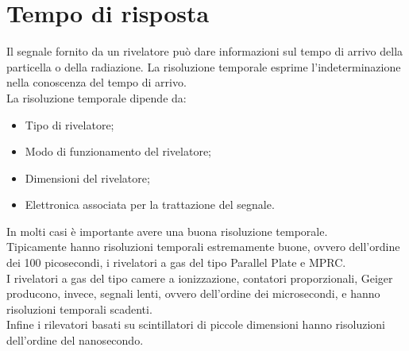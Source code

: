 \documentclass[12pt, letterpaper]{book}
\begin{document}
\section{Tempo di risposta}
Il segnale fornito da un rivelatore può dare informazioni sul tempo di arrivo della particella o della radiazione. La risoluzione temporale esprime l'indeterminazione nella conoscenza del tempo di arrivo.\\
La risoluzione temporale dipende da:
\begin{itemize}
    \item Tipo di rivelatore;
    \item Modo di funzionamento del rivelatore;
    \item Dimensioni del rivelatore;
    \item Elettronica associata per la trattazione del segnale.
\end{itemize}
In molti casi è importante avere una buona risoluzione temporale.\\
Tipicamente hanno risoluzioni temporali estremamente buone, ovvero dell'ordine dei 100 picosecondi, i rivelatori a gas del tipo Parallel Plate e MPRC.\\
I rivelatori a gas del tipo camere a ionizzazione, contatori proporzionali, Geiger producono, invece, segnali lenti, ovvero dell'ordine dei microsecondi, e hanno risoluzioni temporali scadenti.\\
Infine i rilevatori basati su scintillatori di piccole dimensioni hanno risoluzioni dell'ordine del nanosecondo.
\end{document}
